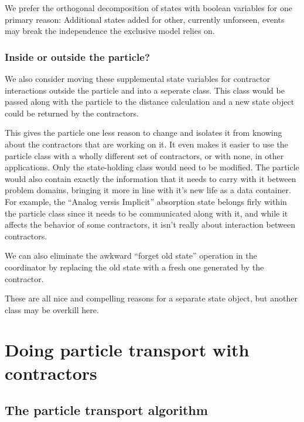 \documentclass[memo]{ResearchNote}
\begin{document}
We prefer the orthogonal decomposition of states with boolean
variables for one primary reason: Additional states added for other,
currently unforseen, events may break the independence the exclusive
model relies on.

\subsubsection{Inside or outside the particle?}

We also consider moving these supplemental state variables for
contractor interactions outside the particle and into a seperate
class. This class would be passed along with the particle to the
distance calculation and a new state object could be returned by the
contractors.

This gives the particle one less reason to change and isolates it from
knowing about the contractors that are working on it. It even makes it
easier to use the particle class with a wholly different set of
contractors, or with none, in other applications. Only the
state-holding class would need to be modified.  The particle would
also contain exactly the information that it needs to carry with it
between problem domains, bringing it more in line with it's new life
as a data container. For example, the ``Analog versis Implicit''
absorption state belongs firly within the particle class since it
needs to be communicated along with it, and while it affects the
behavior of some contractors, it isn't really about interaction
between contractors.

We can also eliminate the awkward ``forget old state'' operation in
the coordinator by replacing the old state with a fresh one generated
by the contractor.

These are all nice and compelling reasons for a separate state object,
but another class may be overkill here.

\section{Doing particle transport with contractors}
\label{sec:particle_transport}

\subsection{The particle transport algorithm}
\end{document}
